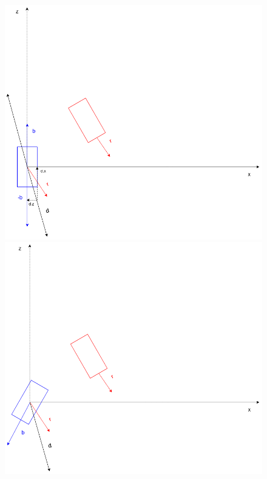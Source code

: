\documentclass[14pt]{article}
\begin{document}
\begin{figure}[H]
\begin{minipage}[t]{0.6\textwidth}
\center
\includegraphics[width=\textwidth]{diagrams/chart.png}
\end{minipage}
\hfill
\begin{minipage}[t]{0.6\textwidth}
\center
\includegraphics[width=\textwidth]{diagrams/chartFirstRot.png}

\end{minipage}
\end{figure}
\end{document}
